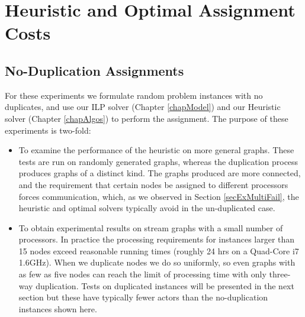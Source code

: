 \section{Heuristic and Optimal Assignment Costs}

\subsection{No-Duplication Assignments}

For these experiments we formulate random problem instances with no duplicates, and use our ILP solver (Chapter \ref{chapModel}) and our Heuristic solver (Chapter \ref{chapAlgos}) to perform the assignment.
The purpose of these experiments is two-fold:
\begin{itemize}
	\item To examine the performance of the heuristic on more general graphs.
			These tests are run on randomly generated graphs, whereas the duplication process produces graphs of a distinct kind.
			The graphs produced are more connected, and the requirement that certain nodes be assigned to different processors forces communication, which, as we observed in Section \ref{secExMultiFail}, the heuristic and optimal solvers typically avoid in the un-duplicated case.
	\item To obtain experimental results on stream graphs with a small number of processors.
			In practice the processing requirements for instances larger than 15 nodes exceed reasonable running times (roughly 24 hrs on a Quad-Core i7 1.6GHz).
			When we duplicate nodes we do so uniformly, so even graphs with as few as five nodes can reach the limit of processing time with only three-way duplication.
			Tests on duplicated instances will be presented in the next section but these have typically fewer actors than the no-duplication instances shown here.
\end{itemize}


